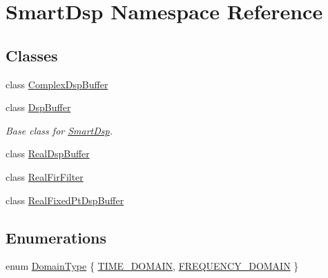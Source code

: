 \hypertarget{namespace_smart_dsp}{\section{Smart\+Dsp Namespace Reference}
\label{namespace_smart_dsp}
}
\subsection*{Classes}
\begin{DoxyCompactItemize}
\item 
class \hyperlink{class_smart_dsp_1_1_complex_dsp_buffer}{Complex\+Dsp\+Buffer}
\item 
class \hyperlink{class_smart_dsp_1_1_dsp_buffer}{Dsp\+Buffer}
\begin{DoxyCompactList}\small\item\em Base class for \hyperlink{namespace_smart_dsp}{Smart\+Dsp}. \end{DoxyCompactList}\item 
class \hyperlink{class_smart_dsp_1_1_real_dsp_buffer}{Real\+Dsp\+Buffer}
\item 
class \hyperlink{class_smart_dsp_1_1_real_fir_filter}{Real\+Fir\+Filter}
\item 
class \hyperlink{class_smart_dsp_1_1_real_fixed_pt_dsp_buffer}{Real\+Fixed\+Pt\+Dsp\+Buffer}
\end{DoxyCompactItemize}
\subsection*{Enumerations}
\begin{DoxyCompactItemize}
\item 
enum \hyperlink{namespace_smart_dsp_a0aa2e95fc5daec3aee23af9976fcafa5}{Domain\+Type} \{ \hyperlink{namespace_smart_dsp_a0aa2e95fc5daec3aee23af9976fcafa5aeb7171be8bf3e58d9181dfb17a37b05f}{T\+I\+M\+E\+\_\+\+D\+O\+M\+A\+I\+N}, 
\hyperlink{namespace_smart_dsp_a0aa2e95fc5daec3aee23af9976fcafa5a18afcb448c591f13ca656af0ae86b017}{F\+R\+E\+Q\+U\+E\+N\+C\+Y\+\_\+\+D\+O\+M\+A\+I\+N}
 \}
\end{DoxyCompactItemize}
